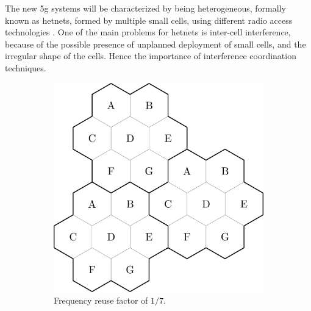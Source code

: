 The new \gls{5g} systems will be characterized by being heterogeneous, formally 
known as \glspl{hetnet}, formed by multiple small cells, using different radio
access technologies \cite{chin14}. One of the main problems for \glspl{hetnet}
is inter-cell interference, because of the possible presence of unplanned
deployment of small cells, and the irregular shape of the cells. Hence the importance of interference coordination techniques.

\begin{figure}[t]
    \centering
    \begin{subfigure}[b]{0.45\textwidth}
            \includegraphics[width=\textwidth]{./01.introduction/img/frequency_reuse}
        \caption{Frequency reuse factor of $1 / 7$.}
        \label{fig:freuse}
    \end{subfigure}
    \begin{subfigure}[b]{0.45\textwidth}

\end{subfigure}
\end{figure}
